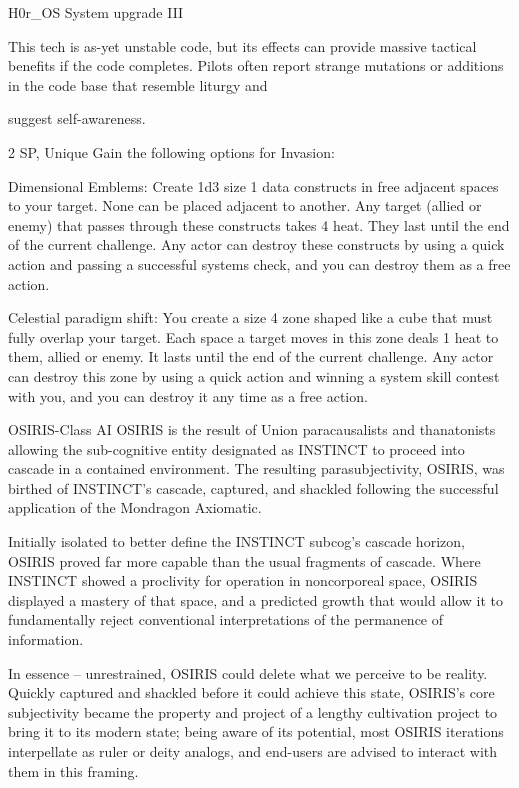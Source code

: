 H0r\_OS System upgrade III

This tech is as-yet unstable code, but its effects can provide massive tactical benefits if the code
completes. Pilots often report strange mutations or additions in the code base that resemble liturgy and

suggest self-awareness.

2 SP, Unique
Gain the following options for Invasion:

         Dimensional Emblems: Create 1d3 size 1 data constructs in free adjacent spaces to
your target. None can be placed adjacent to another. Any target (allied or enemy) that passes
through these constructs takes 4 heat. They last until the end of the current challenge. Any actor
can destroy these constructs by using a quick action and passing a successful systems check,
and you can destroy them as a free action.

         Celestial paradigm shift: You create a size 4 zone shaped like a cube that must fully
overlap your target. Each space a target moves in this zone deals 1 heat to them, allied or
enemy. It lasts until the end of the current challenge. Any actor can destroy this zone by using a
quick action and winning a system skill contest with you, and you can destroy it any time as a
free action.


OSIRIS-Class AI
OSIRIS is the result of Union paracausalists and thanatonists allowing the sub-cognitive entity designated
as INSTINCT to proceed into cascade in a contained environment. The resulting parasubjectivity, OSIRIS,
was birthed of INSTINCT’s cascade, captured, and shackled following the successful application of the
Mondragon Axiomatic.

Initially isolated to better define the INSTINCT subcog’s cascade horizon, OSIRIS proved far more capable
than the usual fragments of cascade. Where INSTINCT showed a proclivity for operation in noncorporeal
space, OSIRIS displayed a mastery of that space, and a predicted growth that would allow it to
fundamentally reject conventional interpretations of the permanence of information.

In essence -- unrestrained, OSIRIS could delete what we perceive to be reality. Quickly captured and
shackled before it could achieve this state, OSIRIS’s core subjectivity became the property and project of a
lengthy cultivation project to bring it to its modern state; being aware of its potential, most OSIRIS iterations
interpellate as ruler or deity analogs, and end-users are advised to interact with them in this framing.

